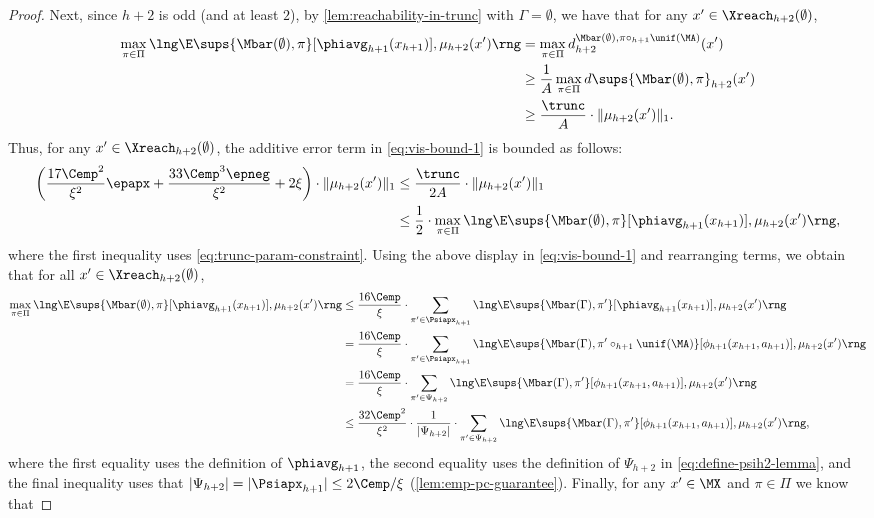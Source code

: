 \documentclass[11pt, oneside]{article}
\theoremstyle{plain}
\theoremstyle{definition}
\numberwithin{theorem}{section}
\renewcommand{\^}[1]{^{(#1)}}
\begin{document}
\begin{proof}
Next, since $h+2$ is odd (and at least $2$), by \cref{lem:reachability-in-trunc} with $\Gamma = \emptyset$, we have that for any $x' \in \Xreach_{h+2}(\emptyset)$,
  \begin{align}
   \max_{\pi \in \Pi} \lng \E\sups{\Mbar(\emptyset), \pi}[\phiavg_{h+1}(x_{h+1})], \mu_{h+2}(x') \rng 
   &=  \max_{\pi \in \Pi} d^{\Mbar(\emptyset),\pi\circ_{h+1}\unif(\MA)}_{h+2}(x') \nonumber\\
    &\geq   \frac{1}{A}\max_{\pi \in \Pi} d\sups{\Mbar(\emptyset),\pi}_{h+2}(x') \nonumber\\
    &\geq   \frac{\trunc}{A} \cdot \| \mu_{h+2}(x') \|_1\nonumber.
  \end{align}
  Thus, for any $x' \in \Xreach_{h+2}(\emptyset)$, the additive error term in \cref{eq:vis-bound-1} is bounded as follows:
  \begin{align}
    \left( \frac{17\Cemp^2}{\xi^2}\epapx + \frac{33\Cemp^3 \epneg}{\xi^2} + {2}\xi \right) \cdot \| \mu_{h+2}(x') \|_1 
    &\leq  \frac{\trunc}{2A} \cdot \| \mu_{h+2}(x') \|_1\nonumber\\
    &\leq \frac 12 \cdot  \max_{\pi \in \Pi} \lng \E\sups{\Mbar(\emptyset), \pi}[\phiavg_{h+1}(x_{h+1})], \mu_{h+2}(x') \rng\nonumber,
  \end{align}
  where the first inequality uses \cref{eq:trunc-param-constraint}. Using the above display in \cref{eq:vis-bound-1} and rearranging  terms, we obtain that for all $x' \in \Xreach_{h+2}(\emptyset)$,
  \begin{align}
    \max_{\pi \in \Pi} \lng \E\sups{\Mbar(\emptyset), \pi} [\phiavg_{h+1}(x_{h+1})], \mu_{h+2}(x') \rng 
    &\leq  \frac{16\Cemp}{\xi} \cdot \sum_{\pi' \in \Psiapx_{h+1}} \lng \E\sups{\Mbar(\Gamma), \pi'}[\phiavg_{h+1}(x_{h+1})], \mu_{h+2}(x')\rng \nonumber\\
    &=  \frac{16\Cemp}{\xi} \cdot \sum_{\pi' \in \Psiapx_{h+1}} \lng \E\sups{\Mbar(\Gamma), \pi' \circ_{h+1} \unif(\MA)}[\phi_{h+1}(x_{h+1}, a_{h+1})], \mu_{h+2}(x')\rng \nonumber\\
    &= \frac{16\Cemp}{\xi} \cdot \sum_{\pi' \in \Psi_{h+2}} \lng \E\sups{\Mbar(\Gamma), \pi'}[\phi_{h+1}(x_{h+1}, a_{h+1})], \mu_{h+2}(x')\rng \nonumber\\
    &\leq  \frac{32\Cemp^2}{\xi^2} \cdot \frac{1}{|\Psi_{h+2}|} \cdot  \sum_{\pi' \in \Psi_{h+2}} \lng \E\sups{\Mbar(\Gamma), \pi'}[\phi_{h+1}(x_{h+1}, a_{h+1})], \mu_{h+2}(x')\rng\nonumber,
  \end{align}
where the first equality uses the definition of $\phiavg_{h+1}$, the second equality uses the definition of $\Psi_{h+2}$ in \cref{eq:define-psih2-lemma}, and the final inequality uses that $|\Psi_{h+2}| = |\Psiapx_{h+1}| \leq 2\Cemp/\xi$ (\cref{lem:emp-pc-guarantee}). Finally, for any $x' \in \MX$ and $\pi \in \Pi$ we know that

\end{proof}
\end{document}
